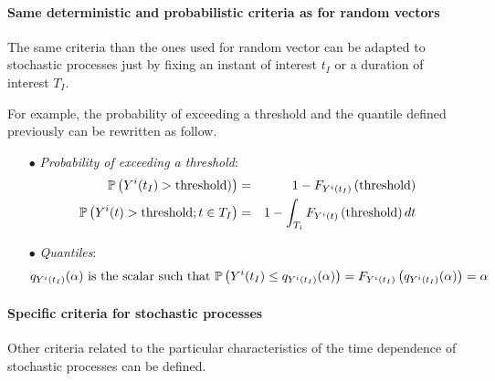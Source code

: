\paragraph{Same deterministic and probabilistic criteria as for random vectors}
\par

The same criteria than the ones used for random vector can be adapted to stochastic processes just by fixing an instant of interest $t_I$ or a duration of interest $T_I$.

For example, the probability of exceeding a threshold and the quantile defined previously can be rewritten as follow.

\begin{itemize}
\item[$\bullet$] {\em Probability of exceeding a threshold}:
  \begin{eqnarray*}
    {\mathbb P}\left( Y^i(t_I) > \textrm{threshold}) \right) &=& 1 - F_{Y^i(t_I)} \left( \textrm{threshold} \right)
    \\
    {\mathbb P}\left( Y^i(t) > \textrm{threshold} ; t \in T_I \right) &=& 1 - \int_{T_i} F_{Y^i(t)}\left( \textrm{threshold} \right) dt
  \end{eqnarray*}

\item[$\bullet$] {\em Quantiles}:
  \begin{align*}
    q_{Y^i(t_I)}(\alpha) \ \textrm{is the scalar such that}\ \Prob{Y^i(t_I) \leq q_{Y^i(t_I)}(\alpha)} = F_{Y^i(t_I)} \left( q_{Y^i(t_I)}(\alpha) \right) = \alpha
  \end{align*}
\end{itemize}


\paragraph{Specific criteria for stochastic processes}
\par
Other criteria related to the particular characteristics of the time dependence of stochastic processes can be defined.

